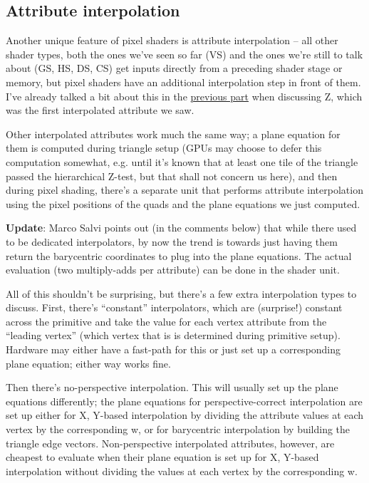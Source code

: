 \documentclass[12pt]{article}
\begin{document}
\subsection{Attribute interpolation}
\label{sec:org6d8bb70}

Another unique feature of pixel shaders is attribute interpolation – all other shader types, both the ones we’ve seen so far (VS) and the ones we’re still to talk about (GS, HS, DS, CS) get inputs directly from a preceding shader stage or memory, but pixel shaders have an additional interpolation step in front of them. I’ve already talked a bit about this in the \hyperref[part7]{previous part} when discussing Z, which was the first interpolated attribute we saw.

Other interpolated attributes work much the same way; a plane equation for them is computed during triangle setup (GPUs may choose to defer this computation somewhat, e.g. until it’s known that at least one tile of the triangle passed the hierarchical Z-test, but that shall not concern us here), and then during pixel shading, there’s a separate unit that performs attribute interpolation using the pixel positions of the quads and the plane equations we just computed.

\textbf{\textbf{Update}}: Marco Salvi points out (in the comments below) that while there used to be dedicated interpolators, by now the trend is towards just having them return the barycentric coordinates to plug into the plane equations. The actual evaluation (two multiply-adds per attribute) can be done in the shader unit.

All of this shouldn’t be surprising, but there’s a few extra interpolation types to discuss. First, there’s “constant” interpolators, which are (surprise!) constant across the primitive and take the value for each vertex attribute from the “leading vertex” (which vertex that is is determined during primitive setup). Hardware may either have a fast-path for this or just set up a corresponding plane equation; either way works fine.

Then there’s no-perspective interpolation. This will usually set up the plane equations differently; the plane equations for perspective-correct interpolation are set up either for X, Y-based interpolation by dividing the attribute values at each vertex by the corresponding w, or for barycentric interpolation by building the triangle edge vectors. Non-perspective interpolated attributes, however, are cheapest to evaluate when their plane equation is set up for X, Y-based interpolation without dividing the values at each vertex by the corresponding w.
\end{document}
